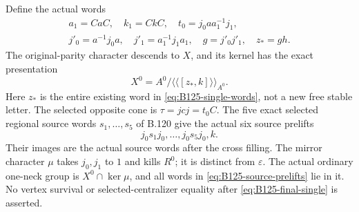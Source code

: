 Define the actual words
\begin{equation}\label{eq:B125-single-words}
 \begin{gathered}
 a_1=CaC,\quad k_1=CkC,\quad
 t_0=j_0a a_1^{-1}j_1,\\
 j'_0=a^{-1}j_0a,\quad j'_1=a_1^{-1}j_1a_1,\quad
 g=j'_0j'_1,\quad z_*=gh.
 \end{gathered}
\end{equation}
The original-parity character descends to $X$, and its kernel has the
exact presentation
\begin{equation}\label{eq:B125-final-single}
 X^0=A^0/\langle\!\langle[z_*,k]\rangle\!\rangle_{A^0}.
\end{equation}
Here $z_*$ is the entire existing word in
\eqref{eq:B125-single-words}, not a new free stable letter.
The selected opposite cone is $\tau=jcj=t_0C$.
The five exact selected regional source words $s_1,\ldots,s_5$
of B.120 give the actual six source prelifts
\begin{equation}\label{eq:B125-source-prelifts}
 j_0s_1j_0,\ldots,j_0s_5j_0,k.
\end{equation}
Their images are the actual source words after the cross filling.
The mirror character $\mu$ takes $j_0,j_1$ to $1$ and kills $R^0$;
it is distinct from $\varepsilon$. The actual ordinary one-neck
group is $X^0\cap\ker\mu$, and all words in
\eqref{eq:B125-source-prelifts} lie in it.
No vertex survival or selected-centralizer equality after
\eqref{eq:B125-final-single} is asserted.

